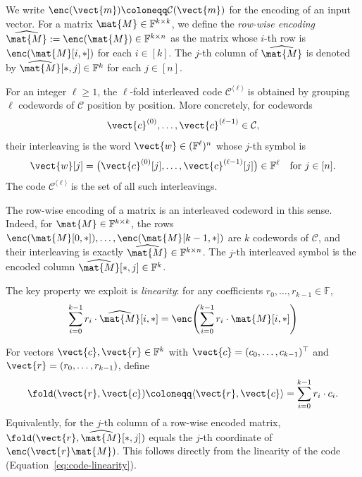 We write $\enc(\vect{m}) \coloneqq \mathcal{C}(\vect{m})$ for the encoding of an input vector.
For a matrix $\mat{M} \in \mathbb{F}^{k \times k}$, we define the
\emph{row-wise encoding} $\widehat{\mat{M}} := \enc(\mat{M}) \in \mathbb{F}^{k \times n}$ as the matrix whose $i$-th row is $\enc(\mat{M}[i,*])$ for each $i \in [k]$.
The $j$-th column of $\widehat{\mat{M}}$ is denoted by
$\widehat{\mat{M}}[*,j] \in \mathbb{F}^k$ for each $j \in [n]$.

\begin{definition}\label{def:interleaved-code}
For an integer \(\ell\ge 1\), the \(\ell\)-fold interleaved code
\(\mathcal{C}^{\langle \ell\rangle}\) is obtained by grouping \(\ell\)
codewords of \(\mathcal{C}\) position by position.  More concretely, for
codewords
\[
  \vect{c}^{(0)},\ldots,\vect{c}^{(\ell-1)}\in\mathcal{C},
\]
their interleaving is the word
\(\vect{w}\in(\mathbb{F}^{\ell})^n\) whose \(j\)-th symbol is
\[
  \vect{w}[j]
  =
  \big(
    \vect{c}^{(0)}[j],
    \ldots,
    \vect{c}^{(\ell-1)}[j]
  \big)
  \in\mathbb{F}^{\ell}
  \quad\text{for }j\in[n].
\]
The code \(\mathcal{C}^{\langle \ell\rangle}\) is the set of all such
interleavings.

The row-wise encoding of a matrix is an interleaved codeword in this sense.
Indeed, for \(\mat{M}\in\mathbb{F}^{k\times k}\), the rows
\(\enc(\mat{M}[0,*]),\ldots,\enc(\mat{M}[k-1,*])\) are \(k\) codewords of
\(\mathcal{C}\), and their interleaving is exactly
\(\widehat{\mat{M}}\in\mathbb{F}^{k\times n}\).  The \(j\)-th interleaved
symbol is the encoded column
\(\widehat{\mat{M}}[*,j]\in\mathbb{F}^{k}\).
\end{definition}

The key property we exploit is \emph{linearity}: for any coefficients
$r_0, \ldots, r_{k-1} \in \mathbb{F}$,
\begin{equation}\label{eq:code-linearity}
\sum_{i=0}^{k-1} r_i \cdot \widehat{\mat{M}}[i,*]
=
\enc\!\left(\sum_{i=0}^{k-1} r_i \cdot \mat{M}[i,*]\right)
\end{equation}


\begin{definition}[Fold]\label{def:fold}
For vectors $\vect{c},\vect{r}\in \mathbb{F}^k$ with
$\vect{c}=(c_0,\ldots,c_{k-1})^\top$ and
$\vect{r}=(r_0,\ldots,r_{k-1})$, define
\[
\fold(\vect{r}, \vect{c}) \coloneqq \langle \vect{r}, \vect{c} \rangle = \sum_{i=0}^{k-1} r_i \cdot c_i.
\]
Equivalently, for the $j$-th column of a row-wise encoded matrix,
$\fold(\vect{r}, \widehat{\mat{M}}[*,j])$ equals the $j$-th coordinate of
$\enc(\vect{r}\mat{M})$.
This follows directly from the linearity of the code (Equation~\ref{eq:code-linearity}).
\end{definition}

